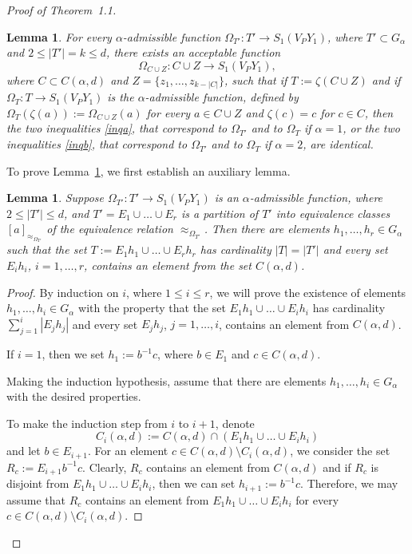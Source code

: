 \documentclass[10pt, reqno]{amsart}
\numberwithin{equation}{section}
\newtheorem{lem}[thm]{Lemma}
\begin{document}
\begin{proof}[Proof of Theorem~1.1]
\begin{lem}\label{lemx} For every ${\alpha}$-admissible function
${{\Omega}}_{T'} : T' \to S_1(V_PY_1)$, where  $T' \subset G_{\alpha}$ and $2 \le |T'|=k \le d$, there exists an acceptable function
$$
{{\Omega}}_{C \cup Z} : C \cup Z \to S_1(V_PY_1) ,
$$
where $C \subset C({\alpha}, d)$ and $Z =   \{ z_1, \dots, z_{k-|C|} \}$,  such that if $T := \zeta(C \cup Z)$ and if ${{\Omega}}_{T} : T \to S_1(V_PY_1)$ is the  ${\alpha}$-admissible function, defined by
 ${{\Omega}}_T( \zeta(a) ) := {{\Omega}}_{C \cup Z}(a)$ for every $a \in C \cup Z$ and $\zeta(c) = c$ for $c \in C$, then the two
 inequalities \eqref{inqa}, that correspond to  ${{\Omega}}_{T'}$ and to ${{\Omega}}_{T}$ if ${\alpha} =1$, or the two
 inequalities \eqref{inqb}, that correspond to  ${{\Omega}}_{T'}$ and to ${{\Omega}}_{T}$ if ${\alpha} =2$, are identical.
\end{lem}

To prove Lemma~\ref{lemx}, we first establish an auxiliary lemma.

\begin{lem}\label{lemy} Suppose ${{\Omega}}_{T'} : T' \to S_1(V_PY_1)$ is an
${\alpha}$-admissible function, where $2 \le |T'| \le d$, and $T' = E_1 \cup \dots \cup  E_r$ is a partition of $T'$ into equivalence classes $[a]_{\approx_{{{\Omega}}_{T'}} }$ of the equivalence relation $\approx_{{{\Omega}}_{T'}}$.
Then there are elements $h_1, \dots, h_r \in G_{\alpha}$ such that the set $T :=  E_1 h_1 \cup \dots \cup E_r h_r$ has cardinality $ |T|= |T'|$ and every set $E_i h_i$, $i = 1, \dots, r$, contains an element from the set  $C({\alpha}, d)$.
\end{lem}

\begin{proof} By induction on $i$, where  $1 \le i \le r$, we will prove the existence of elements
$h_1, \dots, h_i \in G_{\alpha}$ with the property that the set
$E_1 h_1 \cup \dots \cup E_i h_i$ has cardinality $\sum_{j=1}^i |E_j h_j|$ and every set $E_j h_j$, $j = 1, \dots, i$, contains an element from $C({\alpha}, d)$.

If $i=1$, then we set $h_1 := b^{-1} c$, where $b \in E_1$ and $c \in C({\alpha}, d)$.

Making the induction hypothesis, assume that there are elements
$h_1, \dots, h_i \in G_{\alpha}$ with the desired properties.

To make the induction step from $i$ to $i+1$, denote
$$
C_i({\alpha}, d) :=   C({\alpha}, d) \cap  (E_1 h_1 \cup \dots \cup E_i h_i )
$$
and let $b \in E_{i+1}$. For an element $c \in C({\alpha}, d) \setminus C_i({\alpha}, d)$, we consider the set $R_c := E_{i+1} b^{-1} c$. Clearly, $R_c $ contains an element from $C({\alpha}, d)$ and if $R_c $ is disjoint from  $E_1 h_1 \cup \dots \cup E_i h_i$, then we can set $h_{i+1}  :=   b^{-1} c$. Therefore, we may assume that $R_c$ contains an element from $E_1 h_1 \cup \dots \cup E_i h_i$ for every $c \in C({\alpha}, d) \setminus C_i({\alpha}, d)$.


\end{proof}
\end{proof}
\end{document}
